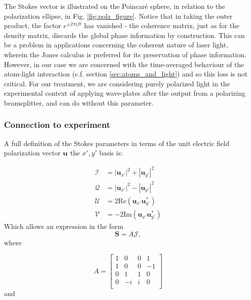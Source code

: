 	The Stokes vector is illustrated on the Poincar\'{e} sphere, in relation to the polarization ellipse, in Fig. \ref{fig:polz_figure}.
	Notice that in taking the outer product, the factor $e^{\pm2\pi i f t}$ has vanished - the coherence matrix, just as for the density matrix, discards the global phase information by construction. 
	This can be a problem in applications concerning the coherent nature of laser light, wherein the Jones calculus is preferred for its preservation of phase information.
	However, in our case we are concerned with the time-averaged behaviour of the atom-light interaction (c.f. section \ref{sec:atoms_and_light}) and so this loss is not critical.
	For our treatment, we are considering purely polarized light in the experimental context of applying wave-plates after the output from a polarizing beamsplitter, and can do without this parameter.


\subsubsection*{Connection to experiment}
	\label{ssec:connection_to_experiment}

	A full definition of the Stokes parameters in terms of the unit electric field polarization vector $\mathbf{u}$ the $x',y'$ basis is:

	\begin{align}
	    \mathcal{I} &= |\mathbf{u}_{x'}|^2 + |\mathbf{u}_{y'}|^2 \\ 
	    \mathcal{Q} &= |\mathbf{u}_{x'}|^2 - |\mathbf{u}_{y'}|^2 \\
	    \mathcal{U} &= 2 \text{Re} \left(\mathbf{u}_{x'} \mathbf{u}_{y'}^*\right) \\
	    \mathcal{V} &= -2 \text{Im}\left(\mathbf{u}_{x'} \mathbf{u}_{y'}^*\right)
	\end{align}
	Which allows an expression in the form
	\begin{equation}
		\mathbf{S} = A \mathcal{J},
	\end{equation}
	where
	
	\begin{equation}
		A=\begin{bmatrix}
		 1 & 0 & 0 & 1 \\
		 1 & 0 & 0 & -1 \\
		 0 & 1 & 1 & 0 \\
		 0 & -i & i & 0 \\
		\end{bmatrix}
	\end{equation}
	and 
	
